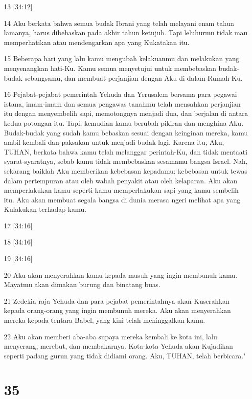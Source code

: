 \par 13 [34:12]
\par 14 Aku berkata bahwa semua budak Ibrani yang telah melayani enam tahun lamanya, harus dibebaskan pada akhir tahun ketujuh. Tapi leluhurmu tidak mau memperhatikan atau mendengarkan apa yang Kukatakan itu.
\par 15 Beberapa hari yang lalu kamu mengubah kelakuanmu dan melakukan yang menyenangkan hati-Ku. Kamu semua menyetujui untuk membebaskan budak-budak sebangsamu, dan membuat perjanjian dengan Aku di dalam Rumah-Ku.
\par 16 Pejabat-pejabat pemerintah Yehuda dan Yerusalem bersama para pegawai istana, imam-imam dan semua pengawas tanahmu telah mensahkan perjanjian itu dengan menyembelih sapi, memotongnya menjadi dua, dan berjalan di antara kedua potongan itu. Tapi, kemudian kamu berubah pikiran dan menghina Aku. Budak-budak yang sudah kamu bebaskan sesuai dengan keinginan mereka, kamu ambil kembali dan paksakan untuk menjadi budak lagi. Karena itu, Aku, TUHAN, berkata bahwa kamu telah melanggar perintah-Ku, dan tidak mentaati syarat-syaratnya, sebab kamu tidak membebaskan sesamamu bangsa Israel. Nah, sekarang baiklah Aku memberikan kebebasan kepadamu: kebebasan untuk tewas dalam pertempuran atau oleh wabah penyakit atau oleh kelaparan. Aku akan memperlakukan kamu seperti kamu memperlakukan sapi yang kamu sembelih itu. Aku akan membuat segala bangsa di dunia merasa ngeri melihat apa yang Kulakukan terhadap kamu.
\par 17 [34:16]
\par 18 [34:16]
\par 19 [34:16]
\par 20 Aku akan menyerahkan kamu kepada musuh yang ingin membunuh kamu. Mayatmu akan dimakan burung dan binatang buas.
\par 21 Zedekia raja Yehuda dan para pejabat pemerintahnya akan Kuserahkan kepada orang-orang yang ingin membunuh mereka. Aku akan menyerahkan mereka kepada tentara Babel, yang kini telah meninggalkan kamu.
\par 22 Aku akan memberi aba-aba supaya mereka kembali ke kota ini, lalu menyerang, merebut, dan membakarnya. Kota-kota Yehuda akan Kujadikan seperti padang gurun yang tidak didiami orang. Aku, TUHAN, telah berbicara."

\chapter{35}

